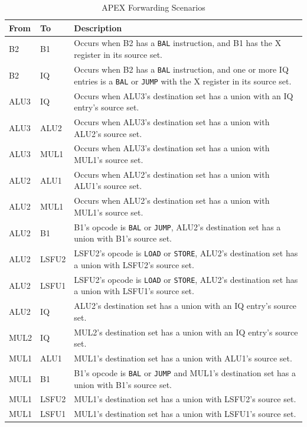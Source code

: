 \documentclass[12pt]{article}
\begin{document}
\begin{table}
  \centering
  \caption{APEX Forwarding Scenarios}
  \label{tab:fwdscenarios}
  \begin{tabular}{l|l|p{5.0in}}
    From & To & Description\\
    \hline
    B2 & B1 & Occurs when B2 has a \texttt{BAL} instruction, and B1 has the X register in its source set. \\
    B2 & IQ & Occurs when B2 has a \texttt{BAL} instruction, and one or more IQ entries is a \texttt{BAL} or \texttt{JUMP} with the X register in its source set. \\
    \hline
    ALU3 & IQ & Occurs when ALU3's destination set has a union with an IQ entry's source set. \\
    ALU3 & ALU2 & Occurs when ALU3's destination set has a union with ALU2's source set. \\
    ALU3 & MUL1 & Occurs when ALU3's destination set has a union with MUL1's source set. \\
    \hline
    ALU2 & ALU1 & Occurs when ALU2's destination set has a union with ALU1's source set.\\
    ALU2 & MUL1 & Occurs when ALU2's destination set has a union with MUL1's source set.\\
    ALU2 & B1 & B1's opcode is \texttt{BAL} or \texttt{JUMP}, ALU2's destination set has a union with B1's source set. \\
    ALU2 & LSFU2 & LSFU2's opcode is \texttt{LOAD} or \texttt{STORE}, ALU2's destination set has a union with LSFU2's source set. \\
    ALU2 & LSFU1 & LSFU2's opcode is \texttt{LOAD} or \texttt{STORE}, ALU2's destination set has a union with LSFU1's source set. \\
    ALU2 & IQ & ALU2's destination set has a union with an IQ entry's source set. \\
    \hline
    MUL2 & IQ & MUL2's destination set has a union with an IQ entry's source set. \\
    \hline
    MUL1 & ALU1 & MUL1's destination set has a union with ALU1's source set. \\
    MUL1 & B1 & B1's opcode is \texttt{BAL} or \texttt{JUMP} and MUL1's destination set has a union with B1's source set. \\
    MUL1 & LSFU2 & MUL1's destination set has a union with LSFU2's source set. \\
    MUL1 & LSFU1 & MUL1's destination set has a union with LSFU1's source set. \\

\end{tabular}
\end{table}
\end{document}
